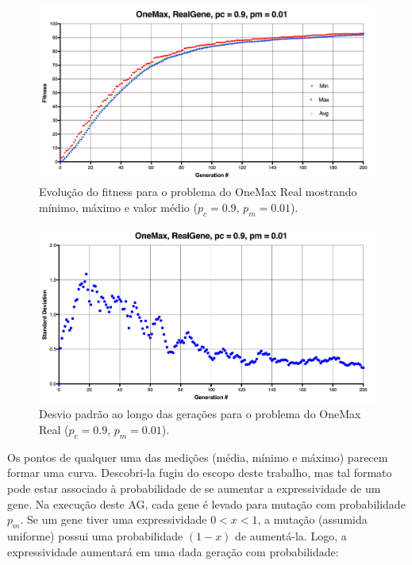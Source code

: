 \begin{figure}[ht!]
    \centering \includegraphics[width=1.0\textwidth]{onemax_real.jpg}
    \caption{Evolução do fitness para o problema do OneMax Real mostrando mínimo, máximo e valor médio ($p_c=0.9$, $p_m=0.01$).}
    \label{fig:onemax_real}
\end{figure}

\begin{figure}[ht!]
    \centering \includegraphics[width=1.0\textwidth]{onemax_real_std.jpg}
    \caption{Desvio padrão ao longo das gerações para o problema do OneMax Real ($p_c=0.9$, $p_m=0.01$).}
    \label{fig:onemax_real_std}
\end{figure}

Os pontos de qualquer uma das medições (média, mínimo e máximo) parecem formar uma curva. Descobri-la fugiu do escopo deste trabalho, mas tal formato pode estar associado à probabilidade de se aumentar a expressividade de um gene. Na execução deste AG, cada gene é levado para mutação com probabilidade $p_m$. Se um gene tiver uma expressividade $0 < x < 1$, a mutação (assumida uniforme) possui uma probabilidade $(1-x)$ de aumentá-la. Logo, a expressividade aumentará em uma dada geração com probabilidade:

